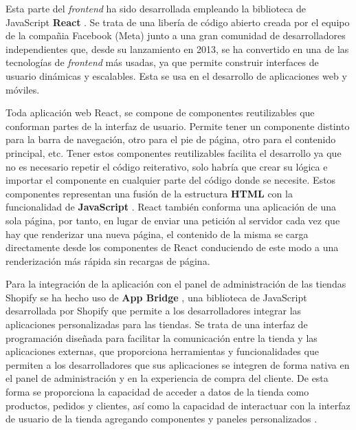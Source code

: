 \documentclass[12pt]{article}
\begin{document}
Esta parte del \textit{frontend} ha sido desarrollada empleando la biblioteca de JavaScript \textbf{React} \cite{react-pag-1}. Se trata de una libería de código abierto creada por el equipo de la
compañia Facebook (Meta) junto a una gran comunidad de desarrolladores independientes que, desde su lanzamiento en 2013, se ha convertido en una
de las tecnologías de \textit{frontend} más usadas, ya que permite construir interfaces de usuario dinámicas y escalables. Esta se usa en el desarrollo de aplicaciones web y móviles. 

Toda aplicación web React, se compone de componentes reutilizables que conforman partes de la interfaz de usuario. Permite tener un componente distinto para
la barra de navegación, otro para el pie de página, otro para el contenido principal, etc.
Tener estos componentes reutilizables facilita el desarrollo ya que no es necesario repetir el código reiterativo, solo habría que crear su lógica e
importar el componente en cualquier parte del código donde se necesite. Estos componentes representan una fusión de la estructura \textbf{HTML} \cite{html} con la funcionalidad de \textbf{JavaScript} \cite{javascript}.
React también conforma una aplicación de una sola página, por tanto, en lugar de enviar una petición al servidor cada vez que hay que renderizar una nueva página,
el contenido de la misma se carga directamente desde los componentes de React conduciendo de este modo a una renderización más rápida sin recargas de página. \cite{react-pag-2}

Para la integración de la aplicación con el panel de administración de las tiendas Shopify se ha hecho uso de \textbf{App Bridge} \cite{app-bridge}, una biblioteca de JavaScript
desarrollada por Shopify que permite a los desarrolladores integrar las aplicaciones personalizadas para las tiendas. Se trata de una interfaz
de programación diseñada para facilitar la comunicación entre la tienda y las aplicaciones externas, que proporciona herramientas y funcionalidades
que permiten a los desarrolladores que sus aplicaciones se integren de forma nativa en el panel de administración y en la experiencia de compra
del cliente. De esta forma se proporciona la capacidad de acceder a datos de la tienda como productos, pedidos y clientes, así como la capacidad de interactuar con la interfaz
de usuario de la tienda agregando componentes y paneles personalizados \cite{shopify-dev}. 
\end{document}
